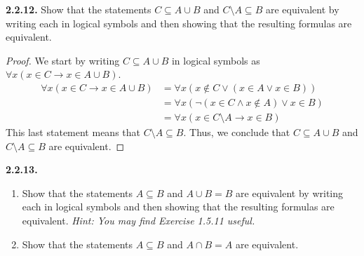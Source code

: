 \documentclass[12pt]{amsart}
\newenvironment{statement}[1]{\smallskip\noindent\color[rgb]{.6627, .3529, .6314} {\bf #1.}}{}
\theoremstyle{definition}
\theoremstyle{remark}
\begin{document}
\begin{statement}{2.2.12}
Show that the statements $C \subseteq A \cup B$ and $C \setminus A \subseteq B$ are equivalent by writing each in logical symbols and then showing that the resulting formulas are equivalent.
\end{statement}

\begin{proof}
We start by writing $C \subseteq A \cup B$ in logical symbols as 
$\forall x (x \in C \rightarrow x \in A \cup B)$.
\begin{align*}
	\forall x (x \in C \rightarrow x \in A \cup B)
	&= \forall x (x \notin C \vee (x \in A \vee x \in B)) \\
	&= \forall x (\neg (x \in C \wedge x \notin A) \vee x \in B) \\
	&= \forall x (x \in C \setminus A \rightarrow x \in B)
\end{align*}
This last statement means that $C \setminus A \subseteq B$.
Thus, we conclude that $C \subseteq A \cup B$ and $C \setminus A \subseteq B$ are equivalent.
\end{proof}


\begin{statement}{2.2.13}
\begin{enumerate}
	\item Show that the statements $A \subseteq B$ and $A \cup B = B$ are equivalent by writing each in logical symbols and then showing that the resulting formulas are equivalent.
	\emph{Hint: You may find Exercise 1.5.11 useful.}
	
	\item Show that the statements $A \subseteq B$ and $A \cap B = A$ are equivalent.
\end{enumerate}
\end{statement}
\end{document}
